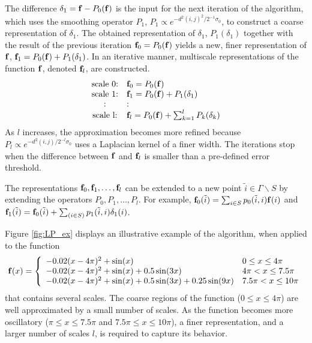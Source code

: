 The difference $\delta_1 = \mathbf{f}-P_0(\mathbf{f})$ is the input for the next iteration of the algorithm,
which uses the smoothing operator $P_1$, $P_1 \propto e^{-d^2(i, j)^2 / 2^{-1} \sigma_0}$, to construct a coarse representation of $\delta_1$.
%
The obtained representation of $\delta_1$, $P_1(\delta_1)$ together with the result of the previous iteration $\mathbf{f}_0 = P_0(\mathbf{f})$
yields a new, finer representation of $\mathbf{f}$, $\mathbf{f}_1 = P_0(\mathbf{f}) + P_1(\delta_1)$.
%
In an iterative manner, multiscale representations of the function $\mathbf{f}$, denoted $\mathbf{f}_l$, are constructed.
\begin{equation} \label{eq:LP_multi_scale}
 \begin{array}{cl}
\mbox{scale 0:} & \mathbf{f}_0 = P_0(\mathbf{f}) \\
\mbox{scale 1:} & \mathbf{f}_1 = P_0(\mathbf{f}) + P_1(\delta_1) \\
: & : \\
\mbox{scale l:} & \mathbf{f}_l = P_0(\mathbf{f}) + \sum_{k=1}^{l}P_k(\delta_k)\\
\end{array}
\end{equation}
As $l$ increases, the approximation becomes more refined because $P_l \propto e^{-d^2(i, j) / 2^{-l} \sigma_0}$ uses a Laplacian kernel of a finer width.
%
The iterations stop when the difference between $\mathbf{f}$ and $\mathbf{f}_l$ is smaller than a pre-defined error threshold.

The representations $\mathbf{f}_0, \mathbf{f}_1, \dots, \mathbf{f}_l$ can be extended to a new point $\tilde{i} \in \Gamma \backslash S $ by extending the operators $P_0, P_1,\ldots,P_l$.
%
For example, $\mathbf{f}_0(\tilde{i}) = \sum_{i \in S} p_0(\tilde{i}, i)\mathbf{f}(i)$ and
$\mathbf{f}_1(\tilde{i}) = \mathbf{f}_0(\tilde{i}) + \sum_{(i \in S)}p_1(\tilde{i}, i)\delta_1(i)$.

Figure \ref{fig:LP_ex} displays an illustrative example of the algorithm, when applied to the function
 \begin{equation} \label{eq:LP_example}
\mathbf{f}(x) = \left\{
\begin{array}{l l}
-0.02(x-4\pi)^2 + \sin(x) &  0 \le x \le 4\pi \\
-0.02(x-4\pi)^2 + \sin(x) + 0.5 \sin(3x) &  4\pi < x \le 7.5 \pi \\
-0.02(x-4\pi)^2 + \sin(x) + 0.5 \sin(3x) +0.25 \sin(9x) &  7.5 \pi < x \le 10 \pi
\end{array}
\right.
\end{equation}
that contains several scales.
%
The coarse regions of the function ($0 \le x \le 4\pi$) are well approximated by a small number of scales.
%
As the function becomes more oscillatory ($\pi \le x \le 7.5\pi$ and $7.5\pi \le x \le 10\pi$),
a finer representation, and a larger number of scales  $l$, is required to capture its behavior.

